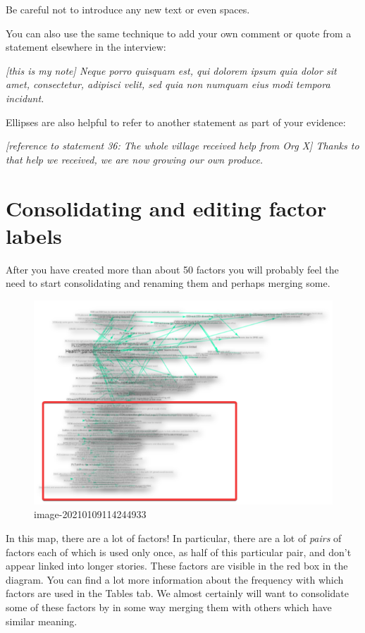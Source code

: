 \documentclass[
]{book}
\begin{document}
Be careful not to introduce any new text or even spaces.

You can also use the same technique to add your own comment or quote from a statement elsewhere in the interview:

\emph{{[}this is my note{]} Neque porro quisquam est, qui dolorem ipsum quia dolor sit amet, consectetur, adipisci velit, sed quia non numquam eius modi tempora incidunt.}

Ellipses are also helpful to refer to another statement as part of your evidence:

\emph{{[}reference to statement 36: The whole village received help from Org X{]} Thanks to that help we received, we are now growing our own produce.}

\hypertarget{consolidating-and-editing-factor-labels}{%
\section{Consolidating and editing factor labels}\label{consolidating-and-editing-factor-labels}}

After you have created more than about 50 factors you will probably feel the need to start consolidating and renaming them and perhaps merging some.

\begin{figure}
\centering
\includegraphics{_assets/image-20210109114244933.png}
\caption{image-20210109114244933}
\end{figure}

In this map, there are a lot of factors! In particular, there are a lot of \emph{pairs} of factors each of which is used only once, as half of this particular pair, and don't appear linked into longer stories. These factors are visible in the red box in the diagram. You can find a lot more information about the frequency with which factors are used in the Tables tab. We almost certainly will want to consolidate some of these factors by in some way merging them with others which have similar meaning.
\end{document}
